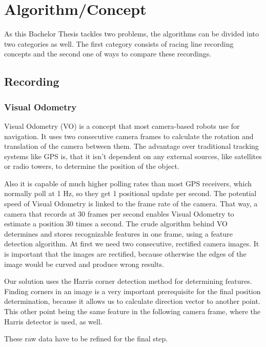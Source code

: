 \section{Algorithm/Concept}
\label{sec:algorithm}
\graphicspath{{utils/}}
As this Bachelor Thesis tackles two problems, the algorithms can be divided into two categories as well.
The first category consists of racing line recording concepts and the second one of ways to compare these recordings.

\subsection{Recording}
\subsubsection{Visual Odometry}
\label{subsec:vo}
Visual Odometry (VO) is a concept that most camera-based robots use for navigation. It uses two consecutive camera frames to calculate the rotation and translation of the camera between them. The advantage over traditional tracking systems like GPS is, that it isn't dependent on any external sources, like satellites or radio towers, to determine the position of the object.

Also it is capable of much higher polling rates than most GPS receivers, which normally poll at 1 Hz, so they get 1 positional update per second. The potential speed of Visual Odometry is linked to the frame rate of the camera. That way, a camera that records at 30 frames per second enables Visual Odometry to estimate a position 30 times a second. 
The crude algorithm behind VO determines and stores recognizable features in one frame, using a feature detection algorithm.
At first we need two consecutive, rectified camera images. It is important that the images are rectified, because otherwise the edges of the image would be curved and produce wrong results.

Our solution uses the Harris corner detection method for determining features. Finding corners in an image is a very important prerequisite for the final position determination, because it allows us to calculate direction vector to another point. This other point being the same feature in the following camera frame, where the Harris detector is used, as well.

These raw data have to be refined for the final step.

